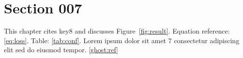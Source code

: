 \section{Section 007}\label{sec:s7}
This chapter cites key8 and discusses Figure~\ref{fig:result}.
Equation reference: \eqref{eq:loss}. Table: \ref{tab:conf}.
Lorem ipsum dolor sit amet 7 consectetur adipiscing elit sed do eiusmod tempor.
\ref{ghost:ref}
